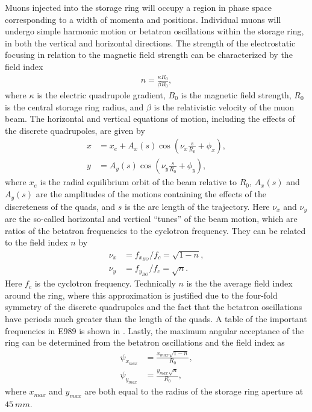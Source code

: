 Muons injected into the storage ring will occupy a region in phase space corresponding to a width of momenta and positions. Individual muons will undergo simple harmonic motion or betatron oscillations within the storage ring, in both the vertical and horizontal directions. The strength of the electrostatic focusing in relation to the magnetic field strength can be characterized by the field index
        \begin{align} \label{eq:fieldindex}
            n = \frac{\kappa R_{0}}{\beta B_{0}},
        \end{align}
where $\kappa$ is the electric quadrupole gradient, $B_{0}$ is the magnetic field strength, $R_{0}$ is the central storage ring radius, and $\beta$ is the relativistic velocity of the muon beam. The horizontal and vertical equations of motion, including the effects of the discrete quadrupoles, are given by
        \begin{align} \label{eq:betatronmotion}
            x &= x_{e} + A_{x}(s) \cos(\nu_{x} \frac{s}{R_{0}} + \phi_{x}), \\
            y &= A_{y}(s) \cos(\nu_{y} \frac{s}{R_{0}} + \phi_{y}), 
        \end{align}
where $x_{e}$ is the radial equilibrium orbit of the beam relative to $R_{0}$, $A_{x}(s)$ and $A_{y}(s)$ are the amplitudes of the motions containing the effects of the discreteness of the quads, and $s$ is the arc length of the trajectory. Here $\nu_{x}$ and $\nu_{y}$ are the so-called horizontal and vertical ``tunes'' of the beam motion, which are ratios of the betatron frequencies to the cyclotron frequency. They can be related to the field index $n$ by
        \begin{equation} \label{eq:tunes}
        \begin{aligned}
            \nu_{x} &= f_{x_{BO}}/f_{c} = \sqrt{1-n}, \\
            \nu_{y} &= f_{y_{BO}}/f_{c} = \sqrt{n}.           
        \end{aligned}
        \end{equation}
Here $f_{c}$ is the cyclotron frequency. Technically $n$ is the the average field index around the ring, where this approximation is justified due to the four-fold symmetry of the discrete quadrupoles and the fact that the betatron oscillations have periods much greater than the length of the quads. A table of the important frequencies in E989 is shown in . Lastly, the maximum angular acceptance of the ring can be determined from the betatron oscillations and the field index as 
        \begin{equation} \label{eq:maxangles}
        \begin{aligned}
            \psi_{x_{max}} &= \frac{x_{max}\sqrt{1-n}}{R_{0}}, \\
            \psi_{y_{max}} &= \frac{y_{max}\sqrt{n}}{R_{0}},
        \end{aligned}
        \end{equation}
where $x_{max}$ and $y_{max}$ are both equal to the radius of the storage ring aperture at $\SI{45}{mm}$.


